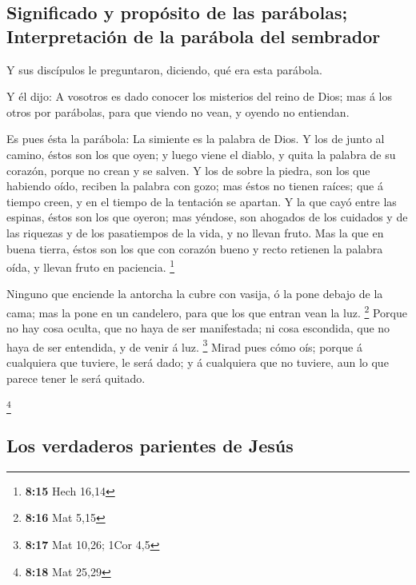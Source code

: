 \hypertarget{significado-y-propuxf3sito-de-las-paruxe1bolas-interpretaciuxf3n-de-la-paruxe1bola-del-sembrador}{%
\subsection{Significado y propósito de las parábolas; Interpretación de
la parábola del
sembrador}\label{significado-y-propuxf3sito-de-las-paruxe1bolas-interpretaciuxf3n-de-la-paruxe1bola-del-sembrador}}

 Y sus discípulos le preguntaron, diciendo, qué era esta
parábola.

 Y él dijo: A vosotros es dado conocer los misterios del
reino de Dios; mas á los otros por parábolas, para que viendo no vean, y
oyendo no entiendan.

 Es pues ésta la parábola: La simiente es la palabra de
Dios.  Y los de junto al camino, éstos son los que oyen; y
luego viene el diablo, y quita la palabra de su corazón, porque no crean
y se salven.  Y los de sobre la piedra, son los que
habiendo oído, reciben la palabra con gozo; mas éstos no tienen raíces;
que á tiempo creen, y en el tiempo de la tentación se apartan.
 Y la que cayó entre las espinas, éstos son los que oyeron;
mas yéndose, son ahogados de los cuidados y de las riquezas y de los
pasatiempos de la vida, y no llevan fruto.  Mas la que en
buena tierra, éstos son los que con corazón bueno y recto retienen la
palabra oída, y llevan fruto en paciencia. \footnote{\textbf{8:15} Hech
  16,14}

 Ninguno que enciende la antorcha la cubre con vasija, ó la
pone debajo de la cama; mas la pone en un candelero, para que los que
entran vean la luz. \footnote{\textbf{8:16} Mat 5,15} 
Porque no hay cosa oculta, que no haya de ser manifestada; ni cosa
escondida, que no haya de ser entendida, y de venir á luz. \footnote{\textbf{8:17}
  Mat 10,26; 1Cor 4,5}  Mirad pues cómo oís; porque á
cualquiera que tuviere, le será dado; y á cualquiera que no tuviere, aun
lo que parece tener le será quitado.

\footnote{\textbf{8:18} Mat 25,29}

\hypertarget{los-verdaderos-parientes-de-jesuxfas}{%
\subsection{Los verdaderos parientes de
Jesús}\label{los-verdaderos-parientes-de-jesuxfas}}

